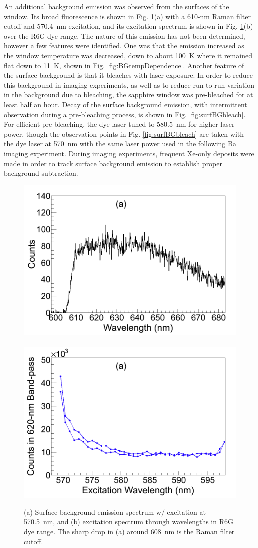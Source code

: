An additional background emission was observed from the surfaces of the window.  Its broad fluorescence is shown in Fig. \ref{fig:surfBG}(a) with a 610-nm Raman filter cutoff and 570.4~nm excitation, and its excitation spectrum is shown in Fig. \ref{fig:surfBG}(b) over the R6G dye range.  The nature of this emission has not been determined, however a few features were identified.  One was that the emission increased as the window temperature was decreased, down to about 100~K where it remained flat down to 11~K, shown in Fig. \ref{fig:BGtempDependence}.  Another feature of the surface background is that it bleaches with laser exposure.  In order to reduce this background in imaging experiments, as well as to reduce run-to-run variation in the background due to bleaching, the sapphire window was pre-bleached for at least half an hour.  Decay of the surface background emission, with intermittent observation during a pre-bleaching process, is shown in Fig. \ref{fig:surfBGbleach}.  For efficient pre-bleaching, the dye laser tuned to 580.5~nm for higher laser power, though the observation points in Fig. \ref{fig:surfBGbleach} are taken with the dye laser at 570~nm with the same laser power used in the following Ba imaging experiment.  During imaging experiments, frequent Xe-only deposits were made in order to track surface background emission to establish proper background subtraction.

\begin{figure} %
        \centering
                \includegraphics[width=.5\textwidth]{figures/surfaceBG_a.png}
                ~
                \includegraphics[width=.5\textwidth]{figures/surfaceBG_b.png}
                \caption{(a) Surface background emission spectrum w/ excitation at 570.5~nm, and (b) excitation spectrum through wavelengths in R6G dye range.  The sharp drop in (a) around 608~nm is the Raman filter cutoff.}
\label{fig:surfBG}
\end{figure}

